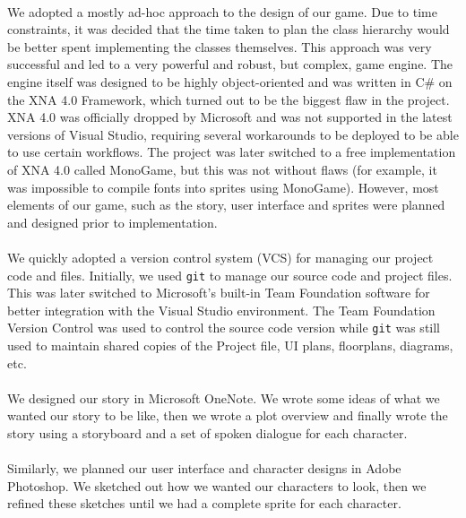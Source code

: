 \documentclass{article}
\begin{document}
\paragraph{}
We adopted a mostly ad-hoc approach to the design of our game. Due to time constraints, it was decided that the time taken to plan the class hierarchy would be better spent implementing the classes themselves. This approach was very successful and led to a very powerful and robust, but complex, game engine. The engine itself was designed to be highly object-oriented and was written in C\# on the XNA 4.0 Framework, which turned out to be the biggest flaw in the project. XNA 4.0 was officially dropped by Microsoft and was not supported in the latest versions of Visual Studio, requiring several workarounds to be deployed to be able to use certain workflows. The project was later switched to a free implementation of XNA 4.0 called MonoGame, but this was not without flaws (for example, it was impossible to compile fonts into sprites using MonoGame). However, most elements of our game, such as the story, user interface and sprites were planned and designed prior to implementation.
\paragraph{}
We quickly adopted a version control system (VCS) for managing our project code and files. Initially, we used \texttt{git} to manage our source code and project files. This was later switched to Microsoft's built-in Team Foundation software for better integration with the Visual Studio environment. The Team Foundation Version Control was used to control the source code version while \texttt{git} was still used to maintain shared copies of the Project file, UI plans, floorplans, diagrams, etc.
\paragraph{}
We designed our story in Microsoft OneNote. We wrote some ideas of what we wanted our story to be like, then we wrote a plot overview and finally wrote the story using a storyboard and a set of spoken dialogue for each character.
\paragraph{}
Similarly, we planned our user interface and character designs in Adobe Photoshop. We sketched out how we wanted our characters to look, then we refined these sketches until we had a complete sprite for each character.
\end{document}
